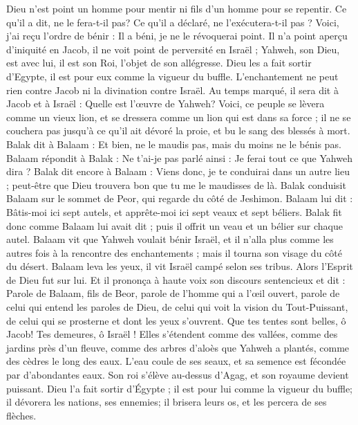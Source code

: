 \begin{multicols}{2}
Dieu n'est point un homme pour mentir ni fils d'un homme pour se repentir. Ce qu’il a dit, ne le fera-t-il pas? Ce qu’il a déclaré, ne l’exécutera-t-il pas ?
Voici, j'ai reçu l’ordre de bénir : Il a béni, je ne le révoquerai point.
Il n'a point aperçu d'iniquité en Jacob, il ne voit point de perversité en Israël ; Yahweh, son Dieu, est avec lui, il est son Roi, l’objet de son allégresse.
Dieu les a fait sortir d'Egypte, il est pour eux comme la vigueur du buffle.
L'enchantement ne peut rien contre Jacob ni la divination contre Israël. Au temps marqué, il sera dit à Jacob et à Israël : Quelle est l’œuvre de Yahweh?
Voici, ce peuple se lèvera comme un vieux lion, et se dressera comme un lion qui est dans sa force ; il ne se couchera pas jusqu’à ce qu’il ait dévoré la proie, et bu le sang des blessés à mort.
Balak dit à Balaam : Et bien, ne le maudis pas, mais du moins ne le bénis pas.
Balaam répondit à Balak : Ne t’ai-je pas parlé ainsi : Je ferai tout ce que Yahweh dira ?
Balak dit encore à Balaam : Viens donc, je te conduirai dans un autre lieu ; peut-être que Dieu trouvera bon que tu me le maudisses de là.
Balak conduisit Balaam sur le sommet de Peor, qui regarde du côté de Jeshimon.
Balaam lui dit : Bâtis-moi ici sept autels, et apprête-moi ici sept veaux et sept béliers.
Balak fit donc comme Balaam lui avait dit ; puis il offrit un veau et un bélier sur chaque autel.
\VerseOne{}Balaam vit que Yahweh voulait bénir Israël, et il n'alla plus comme les autres fois à la rencontre des enchantements ; mais il tourna son visage du côté du désert.
Balaam leva les yeux, il vit Israël campé selon ses tribus. Alors l'Esprit de Dieu fut sur lui.
Et il prononça à haute voix son discours sentencieux et dit : Parole de Balaam, fils de Beor, parole de l'homme qui a l'œil ouvert,
parole de celui qui entend les paroles de Dieu, de celui qui voit la vision du Tout-Puissant, de celui qui se prosterne et dont les yeux s’ouvrent.
Que tes tentes sont belles, ô Jacob! Tes demeures, ô Israël !
Elles s’étendent comme des vallées, comme des jardins près d'un fleuve, comme des arbres d'aloès que Yahweh a plantés, comme des cèdres le long des eaux.
L'eau coule de ses seaux, et sa semence est fécondée par d’abondantes eaux. Son roi s’élève au-dessus d’Agag, et son royaume devient puissant.
Dieu l'a fait sortir d'Égypte ; il est pour lui comme la vigueur du buffle; il dévorera les nations, ses ennemies; il brisera leurs os, et les percera de ses flèches.

\end{multicols}
